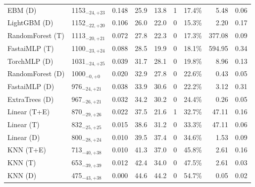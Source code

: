 \begin{tabular}{llcccccrr}
EBM (D) & 1153${}_{-24,+23}$ & 0.148 & 25.9 & 13.8 & 1 & 17.4\% & 5.48 & 0.06 \\
LightGBM (D) & 1152${}_{-22,+20}$ & 0.106 & 26.0 & 22.0 & 0 & 15.3\% & 2.20 & 0.17 \\
RandomForest (T) & 1113${}_{-20,+21}$ & 0.072 & 27.8 & 22.3 & 0 & 17.3\% & 377.08 & 0.09 \\
FastaiMLP (T) & 1100${}_{-23,+24}$ & 0.088 & 28.5 & 19.9 & 0 & 18.1\% & 594.95 & 0.34 \\
TorchMLP (D) & 1031${}_{-24,+25}$ & 0.039 & 31.7 & 28.1 & 0 & 19.8\% & 8.96 & 0.13 \\
RandomForest (D) & 1000${}_{-0,+0}$ & 0.020 & 32.9 & 27.8 & 0 & 22.6\% & 0.43 & 0.05 \\
FastaiMLP (D) & 976${}_{-24,+21}$ & 0.038 & 33.9 & 30.6 & 0 & 22.2\% & 3.12 & 0.31 \\
ExtraTrees (D) & 967${}_{-26,+21}$ & 0.032 & 34.2 & 30.2 & 0 & 24.4\% & 0.26 & 0.05 \\
Linear (T+E) & 870${}_{-29,+26}$ & 0.022 & 37.5 & 21.6 & 1 & 32.7\% & 47.11 & 0.16 \\
Linear (T) & 832${}_{-25,+25}$ & 0.015 & 38.6 & 31.2 & 0 & 33.3\% & 47.11 & 0.06 \\
Linear (D) & 800${}_{-28,+24}$ & 0.010 & 39.5 & 37.4 & 0 & 34.6\% & 1.53 & 0.09 \\
KNN (T+E) & 713${}_{-40,+38}$ & 0.010 & 41.3 & 37.0 & 0 & 45.8\% & 2.61 & 0.16 \\
KNN (T) & 653${}_{-39,+39}$ & 0.012 & 42.4 & 34.0 & 0 & 47.5\% & 2.61 & 0.03 \\
KNN (D) & 475${}_{-43,+38}$ & 0.000 & 44.6 & 44.2 & 0 & 54.7\% & 0.05 & 0.02 \\
\bottomrule
\end{tabular}